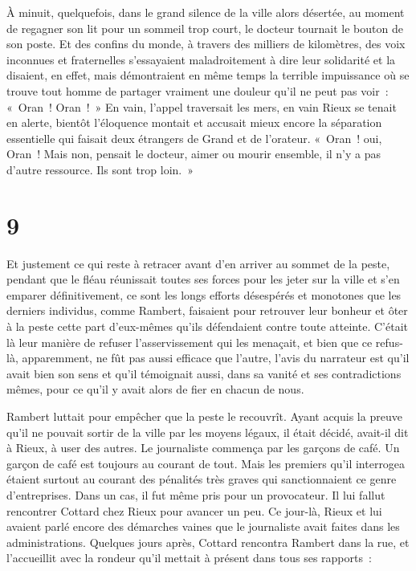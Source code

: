 \documentclass[french,twoside]{book} %
\begin{document}
À minuit, quelquefois, dans le grand silence de la ville alors désertée, au moment de regagner son lit pour un sommeil trop court, le docteur tournait le bouton de son poste. Et des confins du monde, à travers des milliers de kilomètres, des voix inconnues et fraternelles s’essayaient maladroitement à dire leur solidarité et la disaient, en effet, mais démontraient en même temps la terrible impuissance où se trouve tout homme de partager vraiment une douleur qu’il ne peut pas voir : « Oran ! Oran ! » En vain, l’appel traversait les mers, en vain Rieux se tenait en alerte, bientôt l’éloquence montait et accusait mieux encore la séparation essentielle qui faisait deux étrangers de Grand et de l’orateur. « Oran ! oui, Oran ! Mais non, pensait le docteur, aimer ou mourir ensemble, il n’y a pas d’autre ressource. Ils sont trop loin. »
\section[{9}]{9}
\noindent Et justement ce qui reste à retracer avant d’en arriver au sommet de la peste, pendant que le fléau réunissait toutes ses forces pour les jeter sur la ville et s’en emparer définitivement, ce sont les longs efforts désespérés et monotones que les derniers individus, comme Rambert, faisaient pour retrouver leur bonheur et ôter à la peste cette part d’eux-mêmes qu’ils défendaient contre toute atteinte. C’était là leur manière de refuser l’asservissement qui les menaçait, et bien que ce refus-là, apparemment, ne fût pas aussi efficace que l’autre, l’avis du narrateur est qu’il avait bien son sens et qu’il témoignait aussi, dans sa vanité et ses contradictions mêmes, pour ce qu’il y avait alors de fier en chacun de nous.\par
Rambert luttait pour empêcher que la peste le recouvrît. Ayant acquis la preuve qu’il ne pouvait sortir de la ville par les moyens légaux, il était décidé, avait-il dit à Rieux, à user des autres. Le journaliste commença par les garçons de café. Un garçon de café est toujours au courant de tout. Mais les premiers qu’il interrogea étaient surtout au courant des pénalités très graves qui sanctionnaient ce genre d’entreprises. Dans un cas, il fut même pris pour un provocateur. Il lui fallut rencontrer Cottard chez Rieux pour avancer un peu. Ce jour-là, Rieux et lui avaient parlé encore des démarches vaines que le journaliste avait faites dans les administrations. Quelques jours après, Cottard rencontra Rambert dans la rue, et l’accueillit avec la rondeur qu’il mettait à présent dans tous ses rapports :\par
\end{document}
